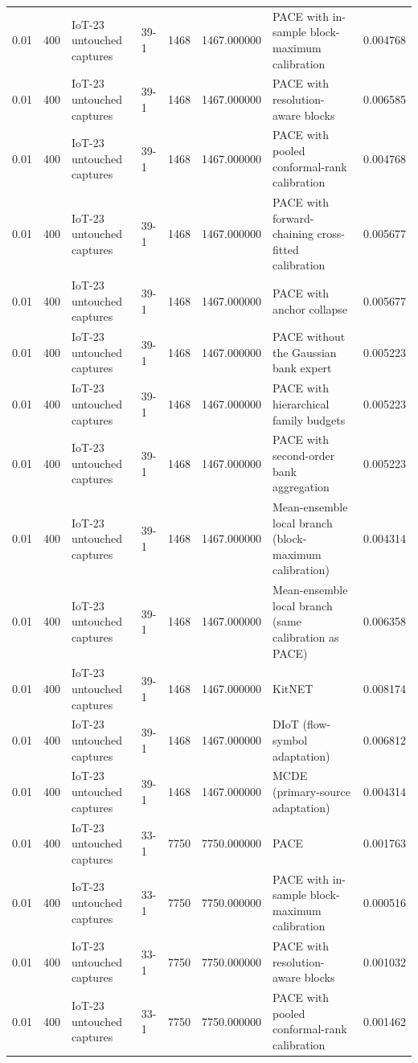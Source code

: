 \begin{tabular}{llllllll}
0.01 & 400 & IoT-23 untouched captures & 39-1 & 1468 & 1467.000000 & PACE with in-sample block-maximum calibration & 0.004768 \\
0.01 & 400 & IoT-23 untouched captures & 39-1 & 1468 & 1467.000000 & PACE with resolution-aware blocks & 0.006585 \\
0.01 & 400 & IoT-23 untouched captures & 39-1 & 1468 & 1467.000000 & PACE with pooled conformal-rank calibration & 0.004768 \\
0.01 & 400 & IoT-23 untouched captures & 39-1 & 1468 & 1467.000000 & PACE with forward-chaining cross-fitted calibration & 0.005677 \\
0.01 & 400 & IoT-23 untouched captures & 39-1 & 1468 & 1467.000000 & PACE with anchor collapse & 0.005677 \\
0.01 & 400 & IoT-23 untouched captures & 39-1 & 1468 & 1467.000000 & PACE without the Gaussian bank expert & 0.005223 \\
0.01 & 400 & IoT-23 untouched captures & 39-1 & 1468 & 1467.000000 & PACE with hierarchical family budgets & 0.005223 \\
0.01 & 400 & IoT-23 untouched captures & 39-1 & 1468 & 1467.000000 & PACE with second-order bank aggregation & 0.005223 \\
0.01 & 400 & IoT-23 untouched captures & 39-1 & 1468 & 1467.000000 & Mean-ensemble local branch (block-maximum calibration) & 0.004314 \\
0.01 & 400 & IoT-23 untouched captures & 39-1 & 1468 & 1467.000000 & Mean-ensemble local branch (same calibration as PACE) & 0.006358 \\
0.01 & 400 & IoT-23 untouched captures & 39-1 & 1468 & 1467.000000 & KitNET & 0.008174 \\
0.01 & 400 & IoT-23 untouched captures & 39-1 & 1468 & 1467.000000 & DIoT (flow-symbol adaptation) & 0.006812 \\
0.01 & 400 & IoT-23 untouched captures & 39-1 & 1468 & 1467.000000 & MCDE (primary-source adaptation) & 0.004314 \\
0.01 & 400 & IoT-23 untouched captures & 33-1 & 7750 & 7750.000000 & PACE & 0.001763 \\
0.01 & 400 & IoT-23 untouched captures & 33-1 & 7750 & 7750.000000 & PACE with in-sample block-maximum calibration & 0.000516 \\
0.01 & 400 & IoT-23 untouched captures & 33-1 & 7750 & 7750.000000 & PACE with resolution-aware blocks & 0.001032 \\
0.01 & 400 & IoT-23 untouched captures & 33-1 & 7750 & 7750.000000 & PACE with pooled conformal-rank calibration & 0.001462 \\

\end{tabular}
